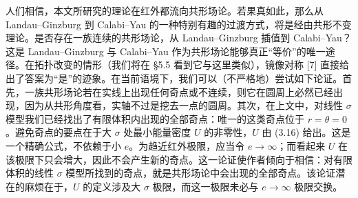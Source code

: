 
\label{op:29}

人们相信，本文所研究的理论在红外都流向共形场论。若果真如此，那么从 Landau--Ginzburg 到 Calabi--Yau 的一种特别有趣的过渡方式，将是经由共形不变理论。是否存在一族连续的共形场论，从 Landau--Ginzburg 插值到 Calabi--Yau？这是 Landau--Ginzburg 与 Calabi--Yau 作为共形场论能够真正“等价”的唯一途径。在拓扑改变的情形（我们将在 §5.5 看到它与这里类似），镜像对称 [7] 直接给出了答案为“是”的迹象。在当前语境下，我们可以（不严格地）尝试如下论证。首先，一族共形场论若在实线上出现任何奇点或不连续，则它在圆周上必然已经出现，因为从共形角度看，实轴不过是挖去一点的圆周。其次，在上文中，对线性 $\sigma$ 模型我们已经找出了有限体积内出现的全部奇点：唯一的这类奇点位于 $r=\theta=0$。避免奇点的要点在于大 $\sigma$ 处最小能量密度 $U$ 的非零性，$U$ 由 (3.16) 给出。这是一个精确公式，不依赖于小 $e$。为趋近红外极限，应当令 $e\to\infty$；而看起来 $U$ 在该极限下只会增大，因此不会产生新的奇点。这一论证使作者倾向于相信：对有限体积的线性 $\sigma$ 模型所找到的奇点，就是共形场论中会出现的全部奇点。该论证潜在的麻烦在于，$U$ 的定义涉及大 $\sigma$ 极限，而这一极限未必与 $e\to\infty$ 极限交换。


